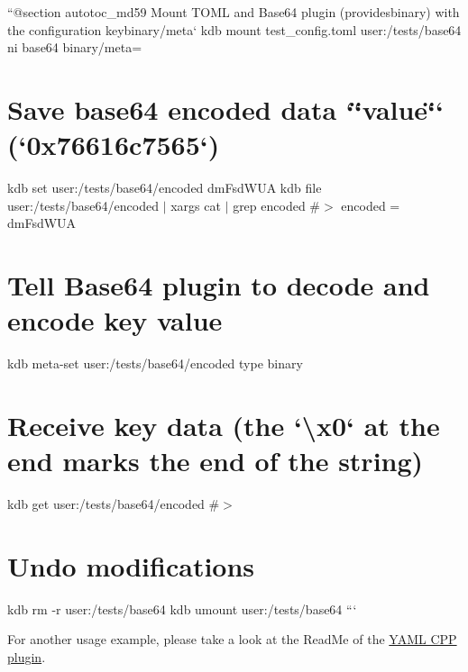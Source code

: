 ``{\ttfamily  @section autotoc\+\_\+md59 Mount T\+O\+ML and Base64 plugin (provides}binary{\ttfamily ) with the configuration key}binary/meta` kdb mount test\+\_\+config.\+toml user\+:/tests/base64 ni base64 binary/meta=\hypertarget{autotoc_md51_autotoc_md60}{}\section{Save base64 encoded data `\char`\"{}value\char`\"{}` (`0x76616c7565`)}\label{autotoc_md51_autotoc_md60}
kdb set user\+:/tests/base64/encoded dm\+Fsd\+W\+UA kdb file user\+:/tests/base64/encoded $\vert$ xargs cat $\vert$ grep encoded \#$>$ encoded = dm\+Fsd\+W\+UA\hypertarget{autotoc_md51_autotoc_md61}{}\section{Tell Base64 plugin to decode and encode key value}\label{autotoc_md51_autotoc_md61}
kdb meta-\/set user\+:/tests/base64/encoded type binary\hypertarget{autotoc_md51_autotoc_md62}{}\section{Receive key data (the `\textbackslash{}x0` at the end marks the end of the string)}\label{autotoc_md51_autotoc_md62}
kdb get user\+:/tests/base64/encoded \#$>$ \hypertarget{autotoc_md51_autotoc_md63}{}\section{Undo modifications}\label{autotoc_md51_autotoc_md63}
kdb rm -\/r user\+:/tests/base64 kdb umount user\+:/tests/base64 ```

For another usage example, please take a look at the Read\+Me of the \hyperlink{autotoc_md807_src_plugins_yamlcpp_README_md}{Y\+A\+ML C\+PP plugin}. 